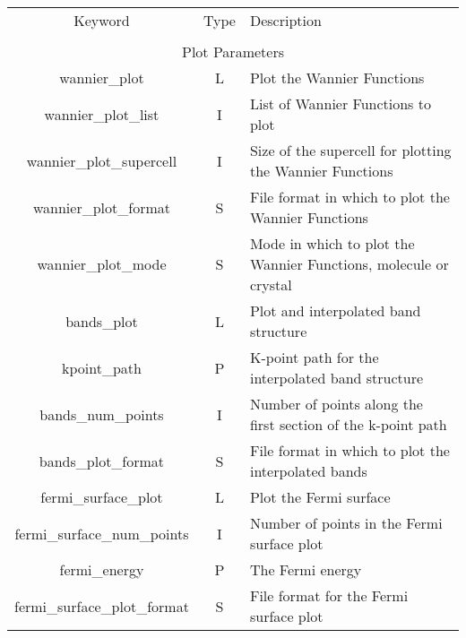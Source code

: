 \begin{table}
\begin{center}
\begin{tabular}{|c|c|p{6cm}|}
\hline
Keyword & Type & Description \\
        &      &             \\
\hline\hline
\multicolumn{3}{|c|}{Plot Parameters} \\
\hline
{\sc wannier\_plot }   & L & Plot the Wannier Functions \\
{\sc wannier\_plot\_list } & I & List of Wannier Functions to plot \\
{\sc wannier\_plot\_supercell }   & I & Size of the supercell for
plotting the Wannier Functions \\
{\sc wannier\_plot\_format }   & S & File format in which to plot the
Wannier Functions \\
{\sc wannier\_plot\_mode }   & S & Mode in which to plot the
Wannier Functions, molecule or crystal \\ 
{\sc bands\_plot }   & L & Plot and interpolated band structure \\
{\sc kpoint\_path }   & P & K-point path for the interpolated band structure  \\
{\sc bands\_num\_points }   & I & Number of points along the first
section of the k-point path \\
{\sc bands\_plot\_format }   & S & File format in which to plot the
interpolated bands \\
{\sc fermi\_surface\_plot }   & L & Plot the Fermi surface \\
{\sc fermi\_surface\_num\_points }   & I & Number of points in the Fermi
surface plot\\
{\sc fermi\_energy }   & P & The Fermi energy \\
{\sc fermi\_surface\_plot\_format }   & S & File format for the Fermi
surface plot \\

\end{tabular}
\end{center}
\end{table}
